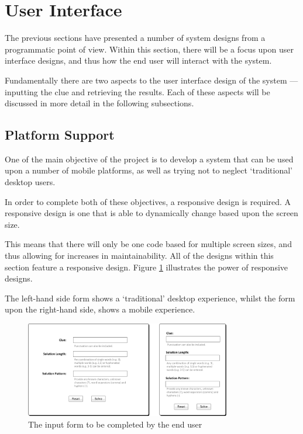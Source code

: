 \section{User Interface}
\label{sec:design_user_interface}

The previous sections have presented a number of system designs from a 
programmatic point of view. Within this section, there will be a focus upon 
user interface designs, and thus how the end user will interact with the system.

Fundamentally there are two aspects to the user interface design of the system 
--- inputting the clue and retrieving the results. Each of these aspects will 
be discussed in more detail in the following subsections.


\subsection{Platform Support} 
\label{sub:platform_support}

One of the main objective of the project is to develop a system that can be used
upon a number of mobile platforms, as well as trying not to neglect 
`traditional' desktop users.

In order to complete both of these objectives, a responsive design is required.
A responsive design is one that is able to dynamically change based upon the 
screen size.

This means that there will only be one code based for multiple screen sizes, and
thus allowing for increases in maintainability. All of the designs within this
section feature a responsive design. Figure \ref{fig:input_form_compare} 
illustrates the power of responsive designs.

The left-hand side form shows a `traditional' desktop experience, whilst the 
form upon the right-hand side, shows a mobile experience.

\begin{figure}[H]
  \centering
  \includegraphics[width=0.8\textwidth]{ui/form_comparison.jpg}
  \caption{The input form to be completed by the end user}
  \label{fig:input_form_compare}
\end{figure}


